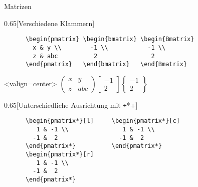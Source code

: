 \begin{frame}[fragile]{%
  Matrizen
  \hfill
}
  \begin{CodeExample}{0.65}[Verschiedene Klammern]
    \begin{verbatim}
      \begin{pmatrix} \begin{bmatrix} \begin{Bmatrix}
        x & y \\        -1 \\           -1 \\
        z & abc          2               2
      \end{pmatrix}   \end{bmatrix}   \end{Bmatrix}
    \end{verbatim}
  \CodeResult<valign=center>
    $\displaystyle
      \begin{pmatrix}
        x & y \\
        z & abc
      \end{pmatrix}
      \begin{bmatrix}
        -1 \\
         2
      \end{bmatrix}
      \begin{Bmatrix}
        -1 \\
         2
      \end{Bmatrix}
    $
  \end{CodeExample}
  \begin{CodeExample}{0.65}[Unterschiedliche Ausrichtung mit \texttt+*+]
    \begin{verbatim}
      \begin{pmatrix*}[l]     \begin{pmatrix*}[c]
         1 & -1 \\               1 & -1 \\
        -1 &  2                 -1 &  2
      \end{pmatrix*}          \end{pmatrix*}
      \begin{pmatrix*}[r]
         1 & -1 \\
        -1 &  2
      \end{pmatrix*}
    \end{verbatim}
  \CodeResult
\end{CodeExample}
\end{frame}
